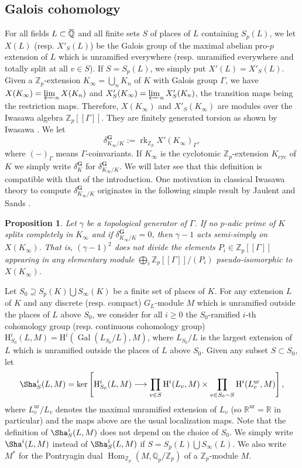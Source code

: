 \documentclass[12pt]{amsart}
\newcommand\bR{\mathbb{R}}
\newcommand\bQ{\mathbb{Q}}
\newcommand\Zp{{\mathbb{Z}_p}}
\newcommand\Qp{{\mathbb{Q}_p}}
\newcommand{\ob}[1]{\mkern 1.5mu\overline{\mkern-1.5mu#1\mkern-1.5mu}\mkern 1.5mu}
\DeclareMathOperator{\Gal}{Gal}
\DeclareMathOperator{\Hom}{Hom}
\DeclareMathOperator{\rk}{rk}
\newcommand{\cyc}{\textrm{cyc}}
\newcommand{\HH}{\mathrm{H}}
\newcommand{\ur}{\mathrm{ur}}
\theoremstyle{defstyle}
\theoremstyle{thmstyle}
\newtheorem{proposition}[subsubsection]{Proposition}
\begin{document}
	\subsection{Galois cohomology}\label{sec:galois_cohomology}
	For all fields $L\subset \ob{\bQ}$ and all finite sets $S$ of places of $L$ containing $S_p(L)$, we let $X(L)$ (resp. $X'_S(L)$) be the Galois group of the maximal abelian pro-$p$ extension of $L$ which is unramified everywhere  (resp. unramified everywhere and totally split at all $v\in S$). If $S=S_p(L)$, we simply put $X'(L)=X'_S(L)$. Given a $\Zp$-extension $K_\infty=\bigcup_n K_n$ of $K$ with Galois group $\Gamma$, we have $X(K_\infty)=\varprojlim_n X(K_n)$ and $X_S'(K_\infty)=\varprojlim_n X_S'(K_n)$, the transition maps being the restriction maps. Therefore, $X(K_\infty)$ and $X'_S(K_\infty)$ are modules over the Iwasawa algebra $\Zp[[\Gamma]]$. They are finitely generated torsion as shown by Iwasawa \cite{iwasawa1973zl}. We let 
	\[\delta^\textbf{G}_{K_\infty/K}:=\rk_{\Zp} X'(K_\infty)_\Gamma,\]
	where $(-)_\Gamma$ means $\Gamma$-coinvariants. If $K_{\infty}$ is the cyclotomic $\Zp$-extension $K_{\cyc}$ of $K$ we simply write $\delta^\textbf{G}_K$ for $\delta^\textbf{G}_{K_\infty/K}$. We will later see that this definition is compatible with that of the introduction. One motivation in classical Iwasawa theory to compute $\delta^\textbf{G}_{K_\infty/K}$ originates in the following simple result by Jaulent and Sands \cite[Proposition 6]{jaulentsands}.
	
	\begin{proposition}\label{prop:jaulentsands}
		Let $\gamma$ be a topological generator of $\Gamma$. If no $p$-adic prime of $K$ splits completely in $K_\infty$ and if $\delta^\textbf{G}_{K_\infty/K}=0$, then $\gamma-1$ acts semi-simply on $X(K_\infty)$. That is, $(\gamma-1)^2$ does not divide the elements $P_i\in \Zp[[\Gamma]]$ appearing in any elementary module $\bigoplus_i \Zp[[\Gamma]]/(P_i)$ pseudo-isomorphic to $X(K_\infty)$.
	\end{proposition}
	
	Let $S_0 \supseteq S_p(K)\bigcup S_\infty(K)$ be a finite set of places of $K$. For any extension $L$ of $K$ and any discrete (resp. compact) $G_L$-module $M$ which is unramified outside the places of $L$ above $S_0$, we consider for all $i\geq 0$ the $S_0$-ramified $i$-th cohomology group (resp. continuous cohomology group) $\HH^i_{S_0}(L,M)=\HH^i(\Gal(L_{S_0}/L),M)$, where $L_{S_0}/L$ is the largest extension of $L$ which is unramified outside the places of $L$ above ${S_0}$. Given any subset $S\subset {S_0}$, let
	$$\Sha_{S}^i(L,M) = \ker\left[ \HH^i_{{S_0}}(L,M) \longrightarrow \prod_{v\in S} \HH^i(L_v,M) \times \prod_{v\in S_0-S} \HH^i(L_v^\ur,M)\right],$$
	where $L_v^\ur/L_v$ denotes the maximal unramified extension of $L_v$ (so $\bR^\ur=\bR$ in particular) and the maps above are the usual localization maps. Note that the definition of $\Sha_{S}^i(L,M)$ does not depend on the choice of $S_0$. We simply write $\Sha^i(L,M)$ instead of $\Sha_{S}^i(L,M)$ if $S=S_p(L)\bigcup S_\infty(L)$. We also write $M^*$ for the Pontryagin dual $\Hom_{\Zp}(M,\Qp/\Zp)$ of a $\Zp$-module $M$.
	
\end{document}
